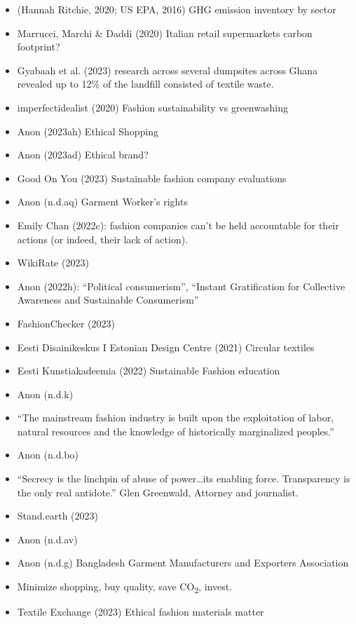 \documentclass[
  letterpaper,
  DIV=11,
  numbers=noendperiod]{scrartcl}
\begin{document}
\begin{itemize}
\item
  (Hannah Ritchie, 2020; US EPA, 2016) GHG emission inventory by sector
\item
  Marrucci, Marchi \& Daddi (2020) Italian retail supermarkets carbon
  footprint?
\item
  Gyabaah et al. (2023) research across several dumpsites across Ghana
  revealed up to 12\% of the landfill consisted of textile waste.
\item
  imperfectidealist (2020) Fashion sustainability vs greenwashing
\item
  Anon (2023ah) Ethical Shopping
\item
  Anon (2023ad) Ethical brand?
\item
  Good On You (2023) Sustainable fashion company evaluations
\item
  Anon (n.d.aq) Garment Worker's rights
\item
  Emily Chan (2022c): fashion companies can't be held accountable for
  their actions (or indeed, their lack of action).
\item
  WikiRate (2023)
\item
  Anon (2022h): ``Political consumerism'', ``Instant Gratification for
  Collective Awareness and Sustainable Consumerism''
\item
  FashionChecker (2023)
\item
  Eesti Disainikeskus I Estonian Design Centre (2021) Circular textiles
\item
  Eesti Kunstiakadeemia (2022) Sustainable Fashion education
\item
  Anon (n.d.k)
\item
  ``The mainstream fashion industry is built upon the exploitation of
  labor, natural resources and the knowledge of historically
  marginalized peoples.''
\item
  Anon (n.d.bo)
\item
  ``Secrecy is the linchpin of abuse of power\ldots its enabling force.
  Transparency is the only real antidote.'' Glen Greenwald, Attorney and
  journalist.
\item
  Stand.earth (2023)
\item
  Anon (n.d.av)
\item
  Anon (n.d.g) Bangladesh Garment Manufacturers and Exporters
  Association
\item
  Minimize shopping, buy quality, save CO\textsubscript{2}, invest.
\item
  Textile Exchange (2023) Ethical fashion materials matter

\end{itemize}
\end{document}
